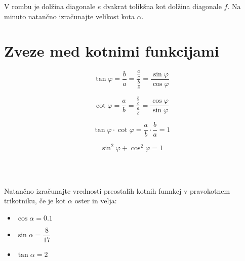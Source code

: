             \begin{naloga}
                V rombu je dolžina diagonale $e$ dvakrat tolikšna kot dolžina diagonale $f$.
                Na minuto natančno izračunajte velikost kota $\alpha$.
            \end{naloga}

        

\newpage



    \section{Zveze med kotnimi funkcijami}

        \begin{multicols}{2}
            $$\displaystyle \tan\varphi=\dfrac{b}{a}=\dfrac{\frac{a}{c}}{\frac{b}{c}}=\dfrac{\sin\varphi}{\cos\varphi}$$
        
            $$\displaystyle \cot\varphi=\dfrac{a}{b}=\dfrac{\frac{b}{c}}{\frac{a}{c}}=\dfrac{\cos\varphi}{\sin\varphi}$$
        
            $$\displaystyle \tan\varphi\cdot\cot\varphi=\dfrac{a}{b}\cdot\dfrac{b}{a}=1$$
        
            $$\sin^2\varphi+\cos^2\varphi =1$$
        \end{multicols}           

        
~\\~\\


        
            \begin{naloga}
                Natančno izračunajte vrednosti preostalih kotnih funnkcj v pravokotnem trikotniku, če je kot $\alpha$ oster in velja:
                \begin{itemize}
                    \item $\cos\alpha=0.1$ 
                    \item $\sin\alpha=\dfrac{8}{17}$ 
                    \item $\tan\alpha=2$ 
                \end{itemize}
            \end{naloga}

        


